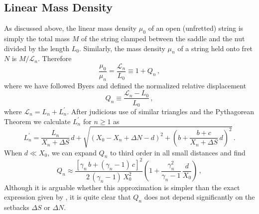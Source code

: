  \subsection{Linear Mass Density\label{sct:model_lmd}}
As discussed above, the linear mass density $\mu_0$ of an open (unfretted) string is simply the total mass $M$ of the string clamped between the saddle and the nut divided by the length $L_0$. Similarly, the mass density $\mu_n$ of a string held onto fret $N$ is $M/\mathcal{L}_n$. Therefore
 \begin{equation}
\frac{\mu_0}{\mu_n} = \frac{\mathcal{L}_n}{L_0} \equiv 1 + Q_n\, ,
 \end{equation}
where we have followed Byers and defined the normalized relative displacement~\cite{ref:byers1996cgi,ref:varieschi2010icf}
 \begin{equation} \label{eqn:q_n_def}
Q_n \equiv \frac{\mathcal{L}_n - L_0}{L_0}\, ,
 \end{equation}
where $\mathcal{L}_n = L_n + L_n^\prime$. After judicious use of similar triangles and the Pythagorean Theorem we calculate $L^\prime_n$ for $n \ge 1$ as
\begin{equation} \label{eqn:l_p_def}
  L^\prime_n = \frac{L_n}{X_n + \Delta S}\, d + \sqrt{\left(X_0 - X_n + \Delta N - d\right)^2 + \left(b + \frac{b + c}{X_n + \Delta S}\, d\right)^2}\, .
\end{equation}
When $d \ll X_0$, we can expand $Q_n$ to third order in all small distances and find
\begin{equation} \label{eqn:q_n_approx}
  Q_n \approx \frac{\left[ \gamma_n\, b + (\gamma_n - 1)\, c \right]^2}{2\, (\gamma_n - 1)\, X_0^2} \left( 1 + \frac{\gamma_n^2}{\gamma_n - 1}\, \frac{d}{X_0} \right)\, ,
\end{equation}
Although it is arguable whether this approximation is simpler than the exact expression given by , it is quite clear that $Q_n$ does not depend significantly on the setbacks $\Delta S$ or $\Delta N$.



